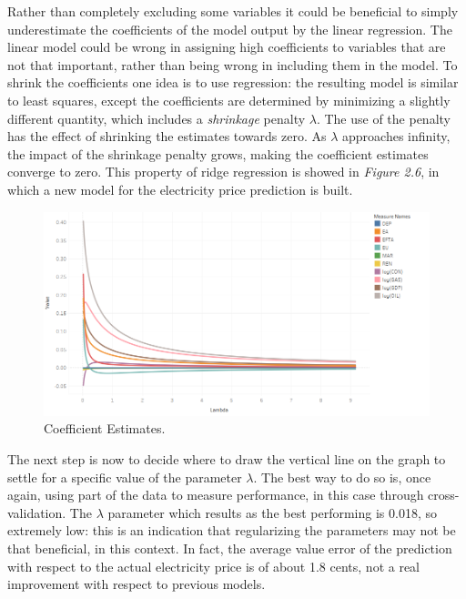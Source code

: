 \documentclass{book}
\begin{document}
Rather than completely excluding some variables it could be beneficial to simply underestimate the coefficients of the model output by the linear regression. The linear model could be wrong in assigning high coefficients to variables that are not that important, rather than being wrong in including them in the model. To shrink the coefficients one idea is to use  regression: the resulting model is similar to least squares, except the coefficients are determined by minimizing a slightly different quantity, which includes a \textit{shrinkage} penalty $\lambda$. The use of the penalty has the effect of shrinking the estimates towards zero. As $\lambda$ approaches infinity, the impact of the shrinkage penalty grows, making the coefficient estimates converge to zero. \cite{james2013introduction} This property of ridge regression is showed in \textit{Figure 2.6}, in which a new model for the electricity price prediction is built.

\bigskip
\begin{figure}[H]
\begin{center}
\captionsetup{justification=centering}
\includegraphics[width=1\textwidth]{Images/ridge.png}
\caption{Coefficient Estimates.}
\end{center}
\end{figure}
\bigskip

The next step is now to decide where to draw the vertical line on the graph to settle for a specific value of the parameter $\lambda$. The best way to do so is, once again, using part of the data to measure performance, in this case through cross-validation. The $\lambda$ parameter which results as the best performing is 0.018, so extremely low: this is an indication that regularizing the parameters may not be that beneficial, in this context. In fact, the average value error of the prediction with respect to the actual electricity price is of about 1.8 cents, not a real improvement with respect to previous models.
\end{document}
